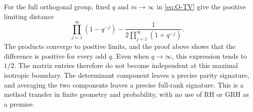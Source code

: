 For the full orthogonal group, fixed $q$ and $m\to\infty$ in
\eqref{eq:O-TV} give the positive limiting distance
\[
 \prod_{j=1}^{\infty}(1-q^{-j})
 -\frac{1}{2\prod_{j=1}^{\infty}(1+q^{-j})}.
\]
The products converge to positive limits, and the proof above shows
that the difference is positive for every odd $q$.
Even when $q\to\infty$, this expression tends to $1/2$.
The matrix entries therefore do not become independent at this maximal
isotropic boundary. The determinant component leaves a precise parity
signature, and averaging the two components leaves a precise full-rank
signature. This is a method transfer in finite geometry and probability,
with no use of RH or GRH as a premise.

